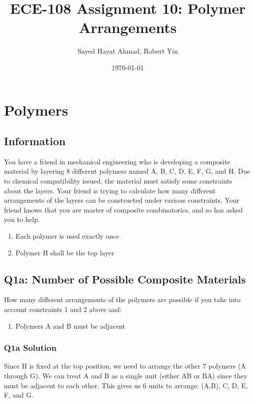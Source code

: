 \documentclass{article}
\title{ECE-108 Assignment 10: Polymer Arrangements}
\author{Sayed Hayat Ahmad, Robert Yin}
\date{\today}
\begin{document}
\maketitle

\section{Polymers}

\subsection*{Information}

You have a friend in mechanical engineering who is developing a composite material by layering 8 different polymers named A, B, C, D, E, F, G, and H. Due to chemical compatibility issued, the material must satisfy some constraints about the layers. Your friend is trying to calculate how many different arrangements of the layers can be constructed under various constraints. Your friend knows that you are master of composite combinatorics, and so has asked you to help.

\begin{enumerate}
    \item Each polymer is used exactly once
    \item Polymer H shall be the top layer
\end{enumerate}

\subsection*{Q1a: Number of Possible Composite Materials}

How many different arrangements of the polymers are possible if you take into account constraints 1 and 2 above and:

\begin{enumerate}[resume]
    \item Polymers A and B must be adjacent
\end{enumerate}

\subsubsection*{Q1a Solution}

Since H is fixed at the top position, we need to arrange the other 7 polymers (A through G). We can treat A and B as a single unit (either AB or BA) since they must be adjacent to each other. This gives us 6 units to arrange: (A,B), C, D, E, F, and G.
\end{document}
